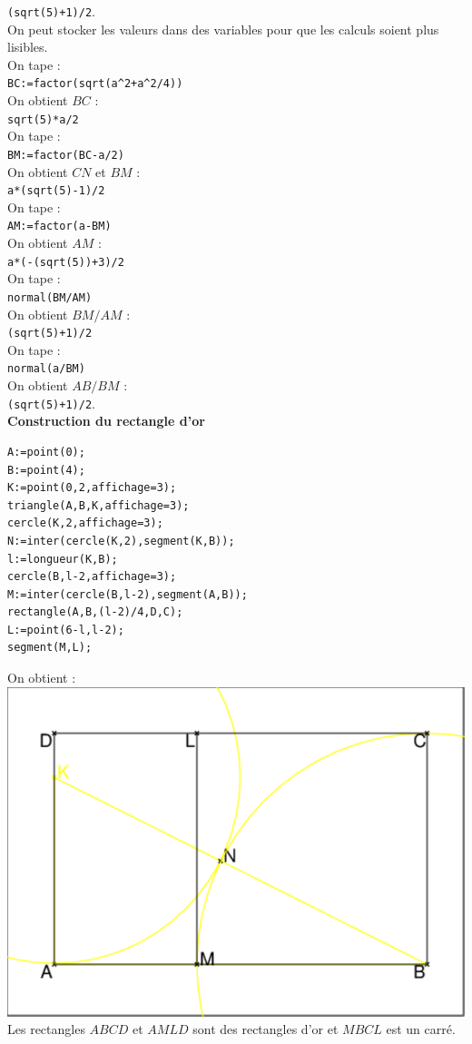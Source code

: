 \documentclass[a4paper,11pt]{book}
\begin{document}
{\tt (sqrt(5)+1)/2}.\\
On peut stocker les valeurs dans des variables pour que les calculs soient plus
 lisibles.\\
On tape :\\
{\tt BC:=factor(sqrt(a\verb|^|2+a\verb|^|2/4))}\\
On obtient $BC$ :\\
{\tt sqrt(5)*a/2}\\
On tape :\\
{\tt BM:=factor(BC-a/2)}\\
On obtient $CN$ et $BM$ :\\
{\tt a*(sqrt(5)-1)/2}\\
On tape :\\
{\tt AM:=factor(a-BM)}\\
On obtient $AM$ :\\
{\tt a*(-(sqrt(5))+3)/2}\\
On tape :\\
{\tt normal(BM/AM)}\\
On obtient $BM/AM$ :\\
{\tt (sqrt(5)+1)/2}\\
On tape :\\
{\tt normal(a/BM)}\\
On obtient $AB/BM$ :\\
{\tt (sqrt(5)+1)/2}.\\
{\bf Construction du rectangle d'or}
\begin{verbatim}
A:=point(0);
B:=point(4);
K:=point(0,2,affichage=3);
triangle(A,B,K,affichage=3);
cercle(K,2,affichage=3);
N:=inter(cercle(K,2),segment(K,B));
l:=longueur(K,B);
cercle(B,l-2,affichage=3);
M:=inter(cercle(B,l-2),segment(A,B));
rectangle(A,B,(l-2)/4,D,C);
L:=point(6-l,l-2);
segment(M,L);
\end{verbatim}
On obtient :\\
\includegraphics[width=\textwidth]{fibonarect}\\
Les rectangles $ABCD$ et $AMLD$ sont des rectangles d'or et $MBCL$ est un 
carr\'e.
\end{document}
